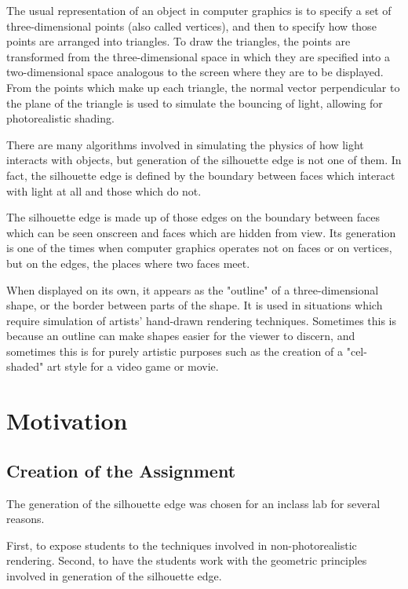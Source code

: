 \documentclass[10pt,twocolumn]{article}
\begin{document}
The usual representation of an object in computer graphics is to specify a set of three-dimensional points (also called vertices), and then to specify how those points are arranged into triangles.  To draw the triangles, the points are transformed from the three-dimensional space in which they are specified into a two-dimensional space analogous to the screen where they are to be displayed.  From the points which make up each triangle, the normal vector perpendicular to the plane of the triangle is used to simulate the bouncing of light, allowing for photorealistic shading.  

There are many algorithms involved in simulating the physics of how light interacts with objects, but generation of the silhouette edge is not one of them.  In fact, the silhouette edge is defined by the boundary between faces which interact with light at all and those which do not.  

The silhouette edge is made up of those edges on the boundary between faces which can be seen onscreen and faces which are hidden from view.  Its generation is one of the times when computer graphics operates not on faces or on vertices, but on the edges, the places where two faces meet.  

When displayed on its own, it appears as the "outline" of a three-dimensional shape, or the border between parts of the shape.  It is used in situations which require simulation of artists' hand-drawn rendering techniques.  Sometimes this is because an outline can make shapes easier for the viewer to discern, and sometimes this is for purely artistic purposes such as the creation of a "cel-shaded" art style for a video game or movie.  

\section{Motivation}
\subsection{Creation of the Assignment}
The generation of the silhouette edge was chosen for an inclass lab for several reasons.  

First, to expose students to the techniques involved in non-photorealistic rendering.  Second, to have the students work with the geometric principles involved in generation of the silhouette edge.  

\end{document}
